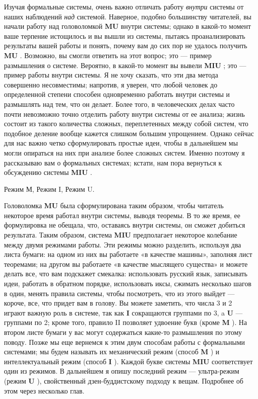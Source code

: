 Изучая формальные системы, очень важно отличать работу \emph{внутри} системы от наших наблюдений \emph{над} системой. Наверное, подобно большинству читателей, вы начали работу над головоломкой \textbf{MU} внутри системы; однако в какой-то момент ваше терпение истощилось и вы вышли из системы, пытаясь проанализировать результаты вашей работы и понять, почему вам до сих пор не удалось получить \textbf{MU} . Возможно, вы смогли ответить на этот вопрос; это --- пример размышления о системе. Вероятно, в какой-то момент вы вывели \textbf{MIU} ; это --- пример работы внутри системы. Я не хочу сказать, что эти два метода совершенно несовместимы; напротив, я уверен, что любой человек до определенной степени способен одновременно работать внутри системы и размышлять над тем, что он делает. Более того, в человеческих делах часто почти невозможно точно отделить работу внутри системы от ее анализа; жизнь состоит из такого количества сложных, переплетенных между собой систем, что подобное деление вообще кажется слишком большим упрощением. Однако сейчас для нас важно четко сформулировать простые идеи, чтобы в дальнейшем мы могли опираться на них при анализе более сложных систем. Именно поэтому я рассказываю вам о формальных системах; кстати, нам пора вернуться к обсуждению системы \textbf{MIU} .

Режим М, Режим I, Режим U.

Головоломка \textbf{MU} была сформулирована таким образом, чтобы читатель некоторое время работал внутри системы, выводя теоремы. В то же время, ее формулировка не обещала, что, оставаясь внутри системы, он сможет добиться результата. Таким образом, система \textbf{MIU} предполагает некоторое колебание между двумя режимами работы. Эти режимы можно разделить, используя два листа бумаги: на одном из них вы работаете «в качестве машины», заполняя лист теоремами; на другом вы работаете «в качестве мыслящего существа» и можете делать все, что вам подскажет смекалка: использовать русский язык, записывать идеи, работать в обратном порядке, использовать иксы, сжимать несколько шагов в один, менять правила системы, чтобы посмотреть, что из этого выйдет --- короче, все, что придет вам в голову. Вы можете заметить, что числа 3 и 2 играют важную роль в системе, так как \textbf{I} сокращаются группами по 3, a \textbf{U} --- группами по 2; кроме того, правило II позволяет удвоение букв (кроме \textbf{M} ). На втором листе бумаги у вас могут содержаться какие-то размышления по этому поводу. Позже мы еще вернемся к этим двум способам работы с формальными системами; мы будем называть их механический режим (способ \textbf{M} ) и интеллектуальный режим (способ \textbf{I} ). Каждой букве системы \textbf{MIU} соответствует один из режимов. В дальнейшем я опишу последний режим --- ультра-режим (режим \textbf{U} ), свойственный дзен-буддистскому подходу к вещам. Подробнее об этом через несколько глав.

